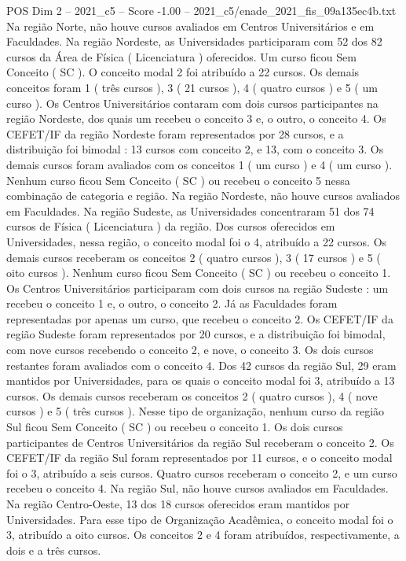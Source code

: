 \begin{textsample}{POS Dim 2 – 2021\_c5 – Score -1.00 – 2021\_c5/enade\_2021\_fis\_09a135ec4b.txt}
Na região Norte, não houve cursos avaliados em Centros Universitários e em Faculdades.
Na região Nordeste, as Universidades participaram com 52 dos 82 cursos da Área de Física ( Licenciatura ) oferecidos.
Um curso ficou Sem Conceito ( SC ).
O conceito modal 2 foi atribuído a 22 cursos.
Os demais conceitos foram 1 ( três cursos ), 3 ( 21 cursos ), 4 ( quatro cursos ) e 5 ( um curso ).
Os Centros Universitários contaram com dois cursos participantes na região Nordeste, dos quais um recebeu o conceito 3 e, o outro, o conceito 4.
Os CEFET/IF da região Nordeste foram representados por 28 cursos, e a distribuição foi bimodal : 13 cursos com conceito 2, e 13, com o conceito 3.
Os demais cursos foram avaliados com os conceitos 1 ( um curso ) e 4 ( um curso ).
Nenhum curso ficou Sem Conceito ( SC ) ou recebeu o conceito 5 nessa combinação de categoria e região.
Na região Nordeste, não houve cursos avaliados em Faculdades.
Na região Sudeste, as Universidades concentraram 51 dos 74 cursos de Física ( Licenciatura ) da região.
Dos cursos oferecidos em Universidades, nessa região, o conceito modal foi o 4, atribuído a 22 cursos.
Os demais cursos receberam os conceitos 2 ( quatro cursos ), 3 ( 17 cursos ) e 5 ( oito cursos ).
Nenhum curso ficou Sem Conceito ( SC ) ou recebeu o conceito 1.
Os Centros Universitários participaram com dois cursos na região Sudeste : um recebeu o conceito 1 e, o outro, o conceito 2.
Já as Faculdades foram representadas por apenas um curso, que recebeu o conceito 2.
Os CEFET/IF da região Sudeste foram representados por 20 cursos, e a distribuição foi bimodal, com nove cursos recebendo o conceito 2, e nove, o conceito 3.
Os dois cursos restantes foram avaliados com o conceito 4.
Dos 42 cursos da região Sul, 29 eram mantidos por Universidades, para os quais o conceito modal foi 3, atribuído a 13 cursos.
Os demais cursos receberam os conceitos 2 ( quatro cursos ), 4 ( nove cursos ) e 5 ( três cursos ).
Nesse tipo de organização, nenhum curso da região Sul ficou Sem Conceito ( SC ) ou recebeu o conceito 1.
Os dois cursos participantes de Centros Universitários da região Sul receberam o conceito 2.
Os CEFET/IF da região Sul foram representados por 11 cursos, e o conceito modal foi o 3, atribuído a seis cursos.
Quatro cursos receberam o conceito 2, e um curso recebeu o conceito 4.
Na região Sul, não houve cursos avaliados em Faculdades.
Na região Centro-Oeste, 13 dos 18 cursos oferecidos eram mantidos por Universidades.
Para esse tipo de Organização Acadêmica, o conceito modal foi o 3, atribuído a oito cursos.
Os conceitos 2 e 4 foram atribuídos, respectivamente, a dois e a três cursos.

\end{textsample}
